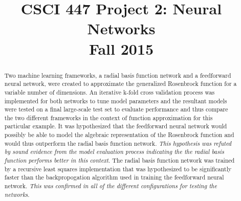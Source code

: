 \documentclass[conference]{IEEEtran}
\begin{document}
\title{CSCI 447 Project 2: Neural Networks \\ Fall 2015}

\author{
  \and
  \and
  }

\maketitle

\begin{abstract}
  Two machine learning frameworks, a radial basis function network and a feedforward neural network, were created to approximate the generalized Rosenbrock function for a variable number of dimensions. An iterative k-fold cross validation process was implemented for both networks to tune model parameters and the resultant models were tested on a final large-scale test set to evaluate performance and thus compare the two different frameworks in the context of function approximation for this particular example. It was hypothesized that the feedforward neural network would possibly be able to model the algebraic representation of the Rosenbrock function and would thus outperform the radial basis function network. \textit{This hypothesis was refuted by sound evidence from the model evaluation process indicating the the radial basis function performs better in this context}. The radial basis function network was trained by a recursive least squares implementation that was hypothesized to be significantly faster than the backpropogation algorithm used in training the feedforward neural network. \textit{This was confirmed in all of the different configurations for testing the networks}. 
  
\end{abstract}
\end{document}
